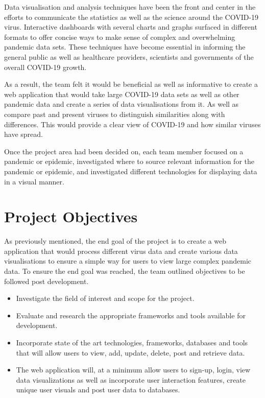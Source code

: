 \vspace{5mm} %

Data visualisation and analysis techniques have been the front and center in the efforts to communicate the statistics as well as the science around the COVID-19 virus. Interactive dashboards with several charts and graphs surfaced in different formats to offer concise ways to make sense of complex and overwhelming pandemic data sets. These techniques have become essential in informing the general public as well as healthcare providers, scientists and governments of the overall COVID-19 growth. 

\vspace{5mm} %

As a result, the team felt it would be beneficial as well as informative to create a web application that would take large COVID-19 data sets as well as other pandemic data and create a series of data visualisations from it. As well as compare past and present viruses to distinguish similarities along with differences. This would provide a clear view of COVID-19 and how similar viruses have spread.

\vspace{5mm} %

Once the project area had been decided on, each team member focused on a pandemic or epidemic, investigated where to source relevant information for the pandemic or epidemic, and investigated different technologies for displaying data in a visual manner.

\section{Project Objectives}
As previously mentioned, the end goal of the project is to create a web application that would process different virus data and create various data visualisations to ensure a simple way for users to view large complex pandemic data. To ensure the end goal was reached, the team outlined objectives to be followed post development.

\begin{itemize}
  \item Investigate the field of interest and scope for the project.
  \item Evaluate and research the appropriate frameworks and tools available for development.
  \item Incorporate state of the art technologies, frameworks, databases and tools that will allow users to view, add, update, delete, post and retrieve data.
  \item The web application will, at a minimum allow users to sign-up, login, view data visualizations as well as incorporate user interaction features, create unique user visuals and post user data to databases. 
\end{itemize}

